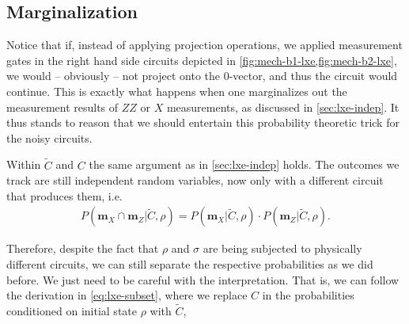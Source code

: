 \subsection{Marginalization}
\label{sec:lxe-err-subset} 
Notice that if, instead of applying projection operations, we applied
measurement gates in the right hand side circuits depicted in
\cref{fig:mech-b1-lxe,fig:mech-b2-lxe}, we would -- obviously -- not project
onto the 0-vector, and thus the circuit would continue. This is exactly what
happens when one marginalizes out the measurement results of $ZZ$ or $X$
measurements, as discussed in \cref{sec:lxe-indep}.  It thus stands to reason
that we should entertain this probability theoretic trick for the noisy
circuits.

Within $\tilde{C}$ and $C$ the same argument as in
\cref{sec:lxe-indep} holds. The outcomes we track are still independent
random variables, now only with a different circuit that produces them,
i.e. 
\begin{align}
  P(\mathbf{m}_X \cap \mathbf{m}_Z | \tilde{C}, \rho) = 
  P(\mathbf{m}_X | \tilde{C}, \rho)\cdot P(\mathbf{m}_Z | \tilde{C}, \rho)
.\end{align}

Therefore, despite the fact that $\rho$ and $\sigma$ are being subjected to physically
different circuits, we can still separate the respective probabilities as we
did before. We just need to be careful with the interpretation. That is, we can
follow the derivation in \cref{eq:lxe-subset}, where we replace $C$ in the
probabilities conditioned on initial state $\rho$ with $\tilde{C}$,

